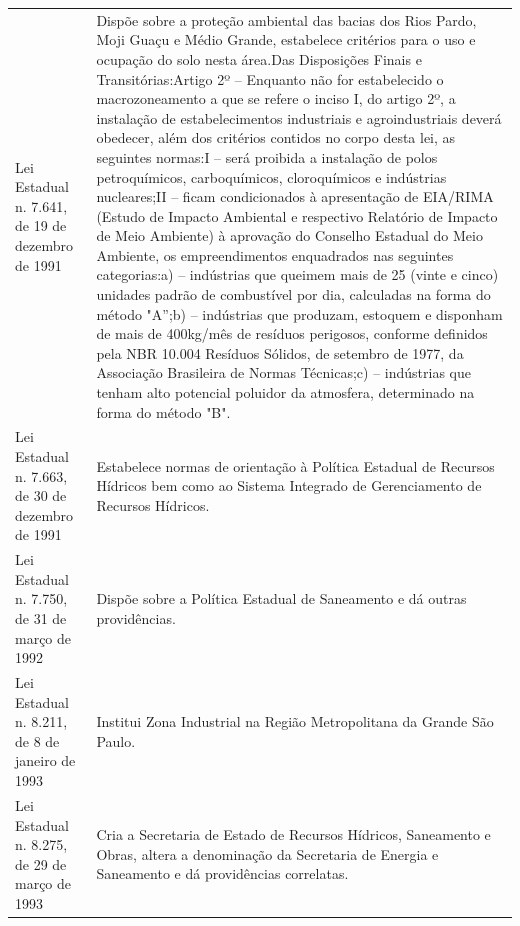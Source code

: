\begin{center}
\begin{longtable}{|p{}|p{}|}
			\hline
			Lei Estadual n. 7.641, de 19 de dezembro de 1991 & Dispõe  sobre  a proteção  ambiental  das  bacias  dos  Rios  Pardo,  Moji  Guaçu  e Médio Grande, estabelece critérios para o uso e ocupação do solo nesta área.\newline{}Das Disposições Finais e Transitórias:\newline{}Artigo 2º – Enquanto não for estabelecido o macrozoneamento a que se refere o inciso   I,   do   artigo   2º,   a   instalação   de   estabelecimentos   industriais   e agroindustriais deverá obedecer, além dos critérios contidos no corpo desta lei, as seguintes normas:\newline{}I   –   será   proibida   a   instalação   de   polos   petroquímicos,   carboquímicos, cloroquímicos e indústrias nucleares;\newline{}II  –  ficam  condicionados  à  apresentação  de  EIA/RIMA  (Estudo  de  Impacto Ambiental e respectivo Relatório de Impacto de Meio Ambiente) à aprovação do Conselho  Estadual  do  Meio  Ambiente,  os  empreendimentos  enquadrados  nas seguintes categorias:\newline{}a)  –  indústrias  que  queimem  mais  de  25  (vinte  e  cinco)  unidades  padrão  de combustível por dia, calculadas na forma do método "A”;\newline{}b) – indústrias que produzam, estoquem e disponham de mais de 400kg/mês de resíduos perigosos, conforme definidos pela NBR 10.004 Resíduos Sólidos, de setembro de 1977, da Associação Brasileira de Normas Técnicas;\newline{}c) – indústrias que tenham alto potencial poluidor da atmosfera, determinado na forma do método "B". \\
			Lei Estadual n. 7.663, de 30 de dezembro de 1991 & Estabelece normas de orientação à Política Estadual de Recursos Hídricos bem como ao Sistema Integrado de Gerenciamento de Recursos Hídricos. \\
			\hline
			Lei Estadual n. 7.750, de 31 de março de 1992 & Dispõe sobre a Política Estadual de Saneamento e dá outras providências. \\
			\hline
			Lei Estadual n. 8.211, de 8 de janeiro de 1993 & Institui Zona Industrial na Região Metropolitana da Grande São Paulo. \\
			\hline
			Lei Estadual n. 8.275, de 29 de março de 1993 & Cria a Secretaria de Estado de Recursos Hídricos, Saneamento e Obras, altera a  denominação  da  Secretaria  de  Energia  e  Saneamento  e  dá  providências correlatas. \\

\end{longtable}
\end{center}
